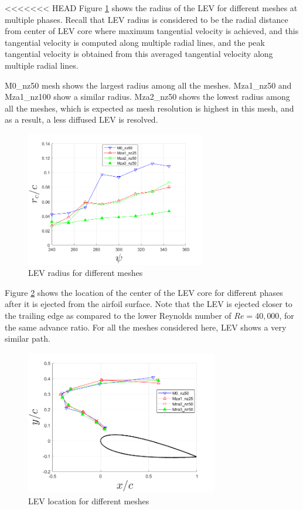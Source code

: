 <<<<<<< HEAD
Figure \ref{fig:zonal_LEV_radius_Re200k} shows the radius of the LEV for different meshes at multiple phases.
Recall that LEV radius is considered to be
the radial distance from center of LEV core where maximum tangential velocity is achieved, and this tangential velocity is computed along multiple radial lines, and the peak tangential
velocity is obtained from this averaged tangential velocity along multiple radial lines.

M0\_nz50 mesh shows the largest radius among all the meshes. Mza1\_nz50 and Mza1\_nz100 show a similar radius.
Mza2\_nz50 shows the lowest radius among all the meshes, which is expected as mesh resolution is highest in this mesh, and as a result, a less diffused LEV is resolved.


\begin{figure}[H]
	\centering
	\includegraphics[width=0.7\textwidth]{figures/zonal_adapt_results/LEV_Re200k/LEV_radius_vp}
	\caption{ LEV radius for different meshes}
	\label{fig:zonal_LEV_radius_Re200k}
\end{figure}

Figure \ref{fig:zonal_LEV_location_Re200k} shows the location of the center of the LEV core for different phases after it is ejected from the airfoil surface.
Note that the LEV is ejected closer to the trailing edge as compared to the lower Reynolds number of $Re=40,000$, for the same advance ratio.
For all the meshes considered here, LEV shows a very similar path.

\begin{figure}[H]
	\centering
	\includegraphics[width=0.75\textwidth]{figures/zonal_adapt_results/LEV_Re200k/LEV_location_Re200k}
	\caption{ LEV location for different meshes}
	\label{fig:zonal_LEV_location_Re200k}
\end{figure}


